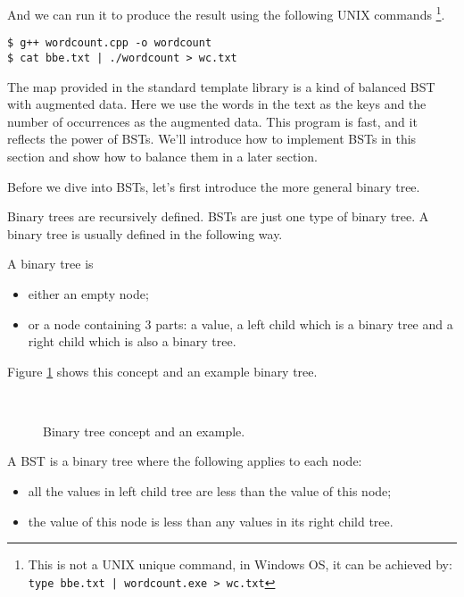 \documentclass{article}
\begin{document}
And we can run it to produce the result using the following UNIX commands
\footnote{This is not a UNIX unique command, in Windows OS, it can be achieved
by: \texttt{type bbe.txt | wordcount.exe > wc.txt}}.

\begin{verbatim}
$ g++ wordcount.cpp -o wordcount
$ cat bbe.txt | ./wordcount > wc.txt
\end{verbatim}

The map provided in the standard template library is a kind of balanced BST
with augmented data. Here we use the words in the text as the keys and the number of
occurrences as the augmented data. This program is fast, and it reflects the power of
BSTs. We'll introduce how to implement BSTs in this section and show how
to balance them in a later section.

Before we dive into BSTs, let's first introduce the more general binary tree.

Binary trees are recursively defined. BSTs are just one
type of binary tree. A binary tree is usually defined in the following way.

A binary tree is
\begin{itemize}
\item either an empty node;
\item or a node containing 3 parts: a value, a left child which is a binary tree and a
right child which is also a binary tree.
\end{itemize}

Figure \ref{fig:binary-tree-example} shows this concept and an example binary tree.

\begin{figure}[htbp]
  \centering
   \\
  \caption{Binary tree concept and an example.}
  \label{fig:binary-tree-example}
\end{figure}

A BST is a binary tree where the following applies to each node:
\begin{itemize}
\item all the values in left child tree are less than the value of this node;
\item the value of this node is less than any values in its right child tree.
\end{itemize}
\end{document}
